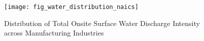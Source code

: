 \begin{figure}[H]
    \centering
    \texttt{[image: fig\_water\_distribution\_naics]}
    \caption{Distribution of Total Onsite Surface Water Discharge Intensity across Manufacturing Industries}
    \label{fig:water-discharge-distribution-naics}
\end{figure}